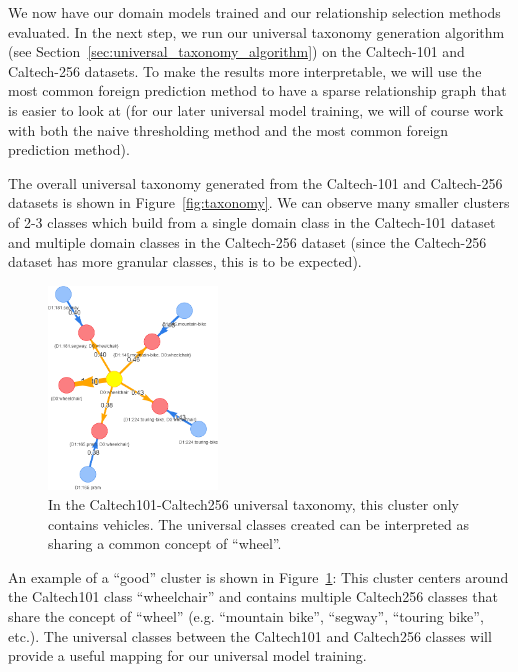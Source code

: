 We now have our domain models trained and our relationship selection methods evaluated.
In the next step, we run our universal taxonomy generation algorithm
(see Section~\ref{sec:universal_taxonomy_algorithm}) on the Caltech-101 and
Caltech-256 datasets. To make the results more interpretable,
we will use the most common foreign prediction method to have a sparse relationship graph
that is easier to look at
(for our later universal model training, we will of course work with both the naive thresholding method and the most common foreign prediction method).

The overall universal taxonomy generated from the Caltech-101 and Caltech-256 datasets
is shown in Figure~\ref{fig:taxonomy}.
We can observe many smaller clusters of 2-3 classes which build from a single domain class in
the Caltech-101 dataset and multiple domain classes in the Caltech-256 dataset
(since the Caltech-256 dataset has more granular classes, this is to be expected).

\begin{figure}[H]
      \centering
      \includegraphics[width=0.4\textwidth]{figures/wheel_concept.png}

      \caption{In the Caltech101-Caltech256 universal taxonomy,
            this cluster only contains vehicles. The universal classes created can be interpreted as
            sharing a common concept of \enquote{wheel}.}
      \label{fig:wheel_concept}
\end{figure}

An example of a \enquote{good} cluster is shown in Figure~\ref{fig:wheel_concept}:
This cluster centers around the Caltech101 class \enquote{wheelchair} and contains
multiple Caltech256 classes that share the concept of \enquote{wheel} (e.g. \enquote{mountain bike}, \enquote{segway}, \enquote{touring bike}, etc.).
The universal classes between the Caltech101 and Caltech256 classes
will provide a useful mapping for our universal model training.

